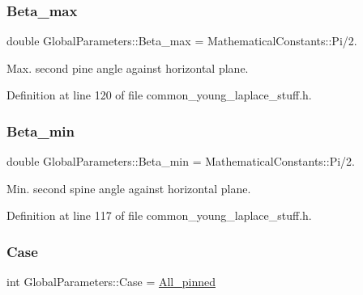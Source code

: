 \mbox{\label{namespaceGlobalParameters_aa34aff6eb29a2a1245e9ffc2fac42caa}} 
\subsubsection{\texorpdfstring{Beta\+\_\+max}{Beta\_max}}
{\footnotesize\ttfamily double Global\+Parameters\+::\+Beta\+\_\+max = Mathematical\+Constants\+::\+Pi/2.}



Max. second pine angle against horizontal plane. 



Definition at line 120 of file common\+\_\+young\+\_\+laplace\+\_\+stuff.\+h.

\mbox{\label{namespaceGlobalParameters_aeb7f1ae574be563e0b603662c6fff5aa}} 
\subsubsection{\texorpdfstring{Beta\+\_\+min}{Beta\_min}}
{\footnotesize\ttfamily double Global\+Parameters\+::\+Beta\+\_\+min = Mathematical\+Constants\+::\+Pi/2.}



Min. second spine angle against horizontal plane. 



Definition at line 117 of file common\+\_\+young\+\_\+laplace\+\_\+stuff.\+h.

\mbox{\label{namespaceGlobalParameters_aeb4257eec7a4c5a92e2b88e93248a201}} 
\subsubsection{\texorpdfstring{Case}{Case}}
{\footnotesize\ttfamily int Global\+Parameters\+::\+Case = \hyperlink{namespaceGlobalParameters_adde04e4243b82e3d4bd2f82d37a2d6bfa28147edc9cfc06038f2a7deaf8890558}{All\+\_\+pinned}}



